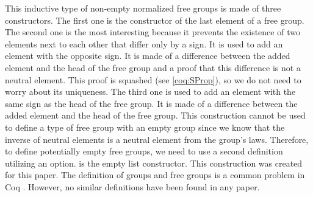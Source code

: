 This inductive type  of non-empty normalized free groups is made of three constructors. The first one  is the constructor of the last element of a free group. The second one  is the most interesting because it prevents the existence of two elements next to each other that differ only by a sign. It is used to add an element with the opposite sign. It is made of a difference between the added element and the head of the free group and a proof that this difference is not a neutral element. This proof is squashed (see \ref{coq:SProp}), so we do not need to worry about its uniqueness. The third one  is used to add an element with the same sign as the head of the free group. It is made of a difference between the added element and the head of the free group. This construction cannot be used to define a type of free group with an empty group since we know that the inverse of neutral elements is a neutral element from the group's laws. Therefore, to define potentially empty free groups, we need to use a second definition utilizing an option.  is the empty list constructor. This construction was created for this paper. The definition of groups and free groups is a common problem in Coq \cite{GroupsCoq} \cite{FreeGroupsCoq}. However, no similar definitions have been found in any paper. 

